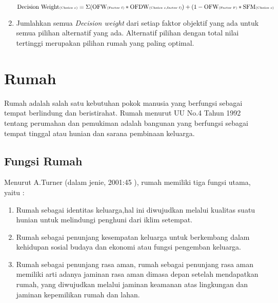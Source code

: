 \begin{enumerate}
$\mbox{Decision Weight} \mbox{{\tiny (Choice c)}} = \Sigma( \mbox{OFW} \mbox{{\tiny(Factor f)}} * \mbox{OFDW} \mbox{{\tiny (Choice c,factor f)}})+(1-\mbox{OFW} \mbox{{\tiny (Factor F)}}*\mbox{SFM} \mbox{{\tiny (Choice c)}}$

\item Jumlahkan semua \textit{Decision weight } dari setiap faktor objektif yang ada untuk semua pilihan alternatif yang ada. Alternatif pilihan dengan total nilai tertinggi merupakan pilihan rumah yang paling optimal. 
	
\end{enumerate}

\section{Rumah}
Rumah adalah salah satu kebutuhan pokok manusia yang berfungsi sebagai tempat berlindung dan beristirahat. Rumah menurut UU No.4 Tahun 1992 tentang perumahan dan pemukiman adalah bangunan yang berfungsi sebagai tempat tinggal atau hunian dan sarana pembinaan keluarga.

\subsection{Fungsi Rumah}
Menurut A.Turner (dalam jenie, 2001:45 ), rumah memiliki tiga fungsi utama, yaitu :
\begin{enumerate}
	\item Rumah sebagai identitas keluarga,hal ini diwujudkan melalui kualitas suatu hunian untuk melindungi  penghuni dari iklim setempat.
	\item Rumah sebagai penunjang kesempatan keluarga untuk berkembang dalam kehidupan sosial budaya dan ekonomi atau fungsi pengemban keluarga.
	\item Rumah sebagai penunjang rasa aman, rumah sebagai penunjang rasa aman memiliki arti adanya jaminan rasa aman dimasa depan setelah mendapatkan rumah, yang diwujudkan melalui jaminan keamanan atas lingkungan dan jaminan kepemilikan rumah dan lahan. 
\end{enumerate}
